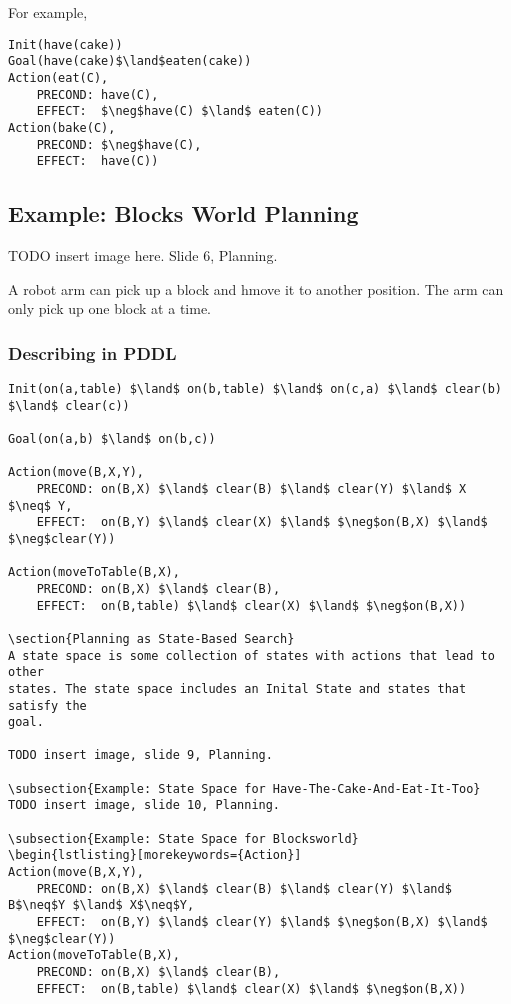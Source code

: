 For example,
\begin{lstlisting}[morekeywords={Init,Goal,Action}]
Init(have(cake))
Goal(have(cake)$\land$eaten(cake))
Action(eat(C),
    PRECOND: have(C),
    EFFECT:  $\neg$have(C) $\land$ eaten(C))
Action(bake(C),
    PRECOND: $\neg$have(C),
    EFFECT:  have(C))
\end{lstlisting}

\subsection{Example: Blocks World Planning}
TODO insert image here. Slide 6, Planning.

A robot arm can pick up a block and hmove it to another position. The arm can
only pick up one block at a time.

\subsubsection{Describing in PDDL}
\begin{lstlisting}[morekeywords={Init,Goal,Action}]
Init(on(a,table) $\land$ on(b,table) $\land$ on(c,a) $\land$ clear(b) $\land$ clear(c))

Goal(on(a,b) $\land$ on(b,c))

Action(move(B,X,Y),
    PRECOND: on(B,X) $\land$ clear(B) $\land$ clear(Y) $\land$ X $\neq$ Y,
    EFFECT:  on(B,Y) $\land$ clear(X) $\land$ $\neg$on(B,X) $\land$ $\neg$clear(Y))

Action(moveToTable(B,X),
    PRECOND: on(B,X) $\land$ clear(B),
    EFFECT:  on(B,table) $\land$ clear(X) $\land$ $\neg$on(B,X))

\section{Planning as State-Based Search}
A state space is some collection of states with actions that lead to other
states. The state space includes an Inital State and states that satisfy the
goal.

TODO insert image, slide 9, Planning.

\subsection{Example: State Space for Have-The-Cake-And-Eat-It-Too}
TODO insert image, slide 10, Planning.

\subsection{Example: State Space for Blocksworld}
\begin{lstlisting}[morekeywords={Action}]
Action(move(B,X,Y),
    PRECOND: on(B,X) $\land$ clear(B) $\land$ clear(Y) $\land$ B$\neq$Y $\land$ X$\neq$Y,
    EFFECT:  on(B,Y) $\land$ clear(Y) $\land$ $\neg$on(B,X) $\land$ $\neg$clear(Y))
Action(moveToTable(B,X),
    PRECOND: on(B,X) $\land$ clear(B),
    EFFECT:  on(B,table) $\land$ clear(X) $\land$ $\neg$on(B,X))
\end{lstlisting}

